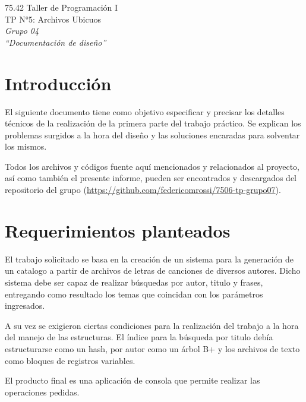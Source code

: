 \documentclass{article}
\begin{document}
\setcounter{page}{5}

\begin{titlepage}
	\vspace*{\fill}
	\begin{center}
		\Large 75.42 Taller de Programación I \\
		\Huge TP N°5: Archivos Ubicuos \\
		\bigskip\huge\textit{Grupo 04} \\
		\bigskip\bigskip\bigskip\bigskip\bigskip\bigskip
		\bigskip\bigskip\bigskip\bigskip\bigskip\bigskip\bigskip
		\medskip\huge\textit{``Documentación de diseño''} \\
		\date{}
	\end{center}
	\vspace*{\fill}
\end{titlepage}
\newpage



\tableofcontents
\newpage
{}


\section{Introducción}
	
	El siguiente documento tiene como objetivo especificar y precisar los detalles técnicos de la realización de la primera parte del trabajo práctico. Se explican los problemas surgidos a la hora del diseño y las soluciones encaradas para solventar los mismos.
	\par
	Todos los archivos y códigos fuente aquí mencionados y relacionados al proyecto, así como también el presente informe, pueden ser encontrados y descargados del repositorio del grupo (\url{https://github.com/federicomrossi/7506-tp-grupo07}).
\bigskip




\section{Requerimientos planteados}

	El trabajo solicitado se basa en la creación de un sistema para la generación de un catalogo a partir de archivos de letras de canciones de diversos autores. Dicho sistema debe ser capaz de realizar búsquedas por autor, titulo y frases, entregando como resultado los temas que coincidan con los parámetros ingresados.
	\par
	A su vez se exigieron ciertas condiciones para la realización del trabajo a la hora del manejo de las estructuras. El índice para la búsqueda por titulo debía estructurarse como un hash, por autor como un árbol B+ y los archivos de texto como bloques de registros variables.
	\par
	El producto final es una aplicación de consola que permite realizar las operaciones pedidas.
	\bigskip
\end{document}
